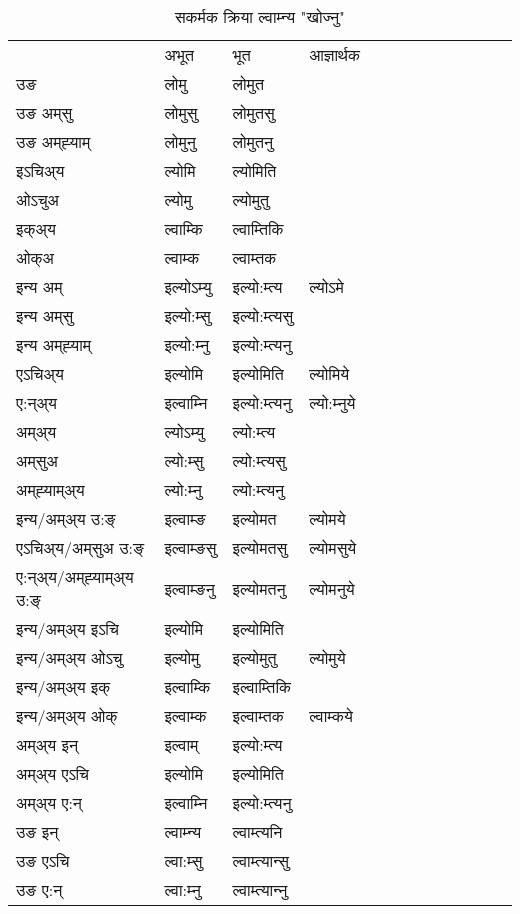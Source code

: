 \begin{table}[H]
\centering
\caption{\label{om.vt} सकर्मक क्रिया  ल्वाम्‍न्य  "खोज्नु"  }
\begin{tabular}{l|l|l|l|l|l|l|l|l|l|l|l|l}  \toprule
&अभूत & भूत & आज्ञार्थक \\ 
उङ &लोमु &लोमुत \\ 
उङ अम्‌सु &लोमुसु &लोमुतसु \\ 
उङ अम्‌ह्‍याम् &लोमुनु &लोमुतनु \\ 
इऽचिअ्य &ल्योमि &ल्योमिति   \\ 
ओऽचुअ &ल्योमु &ल्योमुतु   \\ 
इक्अ्य &ल्वाम्कि &ल्वाम्तिकि   \\ 
ओक्अ &ल्वाम्क &ल्वाम्तक   \\ 
इन्य अम् & इल्योऽम्यु  & इल्यो:म्त्य &ल्योऽमे  \\ 
इन्य अम्‌सु & इल्यो:म्सु  & इल्यो:म्त्यसु   \\ 
इन्य अम्‌ह्‍याम् & इल्यो:म्‍नु  & इल्यो:म्त्यनु   \\ 
एऽचिअ्य & इल्योमि & इल्योमिति &ल्योमिये    \\ 
ए:न्अ्य & इल्वाम्‍नि  & इल्यो:म्त्यनु &ल्यो:म्‍नुये  \\ 
अम्अ्य & ल्योऽम्यु  & ल्यो:म्त्य  \\ 
अम्‌सुअ & ल्यो:म्सु & ल्यो:म्त्यसु  \\ 
अम्‌ह्‍याम्अ्य & ल्यो:म्‍नु  & ल्यो:म्त्यनु \\ 
\midrule
इन्य/अम्अ्य उ:ङ्‌&इल्वाम्ङ & इल्योमत &ल्योमये \\ 
एऽचिअ्य/अम्‌सुअ उ:ङ्‌ &इल्वाम्ङसु & इल्योमतसु &ल्योमसुये \\ 
ए:न्अ्य/अम्‌ह्‍याम्अ्य उ:ङ्‌ &इल्वाम्ङनु & इल्योमतनु &ल्योमनुये \\ 
इन्य/अम्अ्य इऽचि & इल्योमि & इल्योमिति    \\ 
इन्य/अम्अ्य ओऽचु & इल्योमु & इल्योमुतु  &ल्योमुये  \\ 
इन्य/अम्अ्य इक् & इल्वाम्कि & इल्वाम्तिकि   \\ 
इन्य/अम्अ्य ओक् & इल्वाम्क & इल्वाम्तक  &ल्वाम्कये  \\ 
अम्अ्य इन् & इल्वाम् & इल्यो:म्त्य   \\ 
अम्अ्य एऽचि & इल्योमि & इल्योमिति    \\ 
अम्अ्य ए:न् & इल्वाम्‍नि  & इल्यो:म्त्यनु  \\ 
\midrule
उङ इन् & ल्वाम्‍न्य  & ल्वाम्त्यनि  \\ 
उङ एऽचि & ल्वा:म्सु  & ल्वाम्त्यान्सु   \\ 
उङ ए:न्& ल्वा:म्‍नु  & ल्वाम्त्यान्‍नु   \\ 
\bottomrule
\end{tabular}
\end{table}


